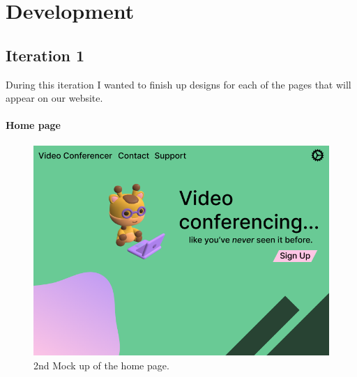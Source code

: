 \pagestyle{fancy}
\chead{\mdseries \thepage}

\chapter{Development}
\label{chap:development}

\section{Iteration 1}

During this iteration I wanted to finish up designs for each 
of the pages that will appear on our website.

\subsubsection{Home page}

\begin{figure}[H]
\centering

\includegraphics[scale=0.2]{Images/HomeUI_2.png}

\caption{2nd Mock up of the home page.}
\label{fig:ui2}
\end{figure}


